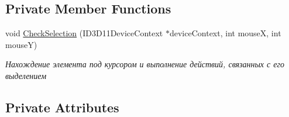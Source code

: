 \subsection*{Private Member Functions}
\begin{DoxyCompactItemize}
\item 
void \hyperlink{class_interface_class_a3e7e6b441d10db7836e42e0746338287}{Check\+Selection} (I\+D3\+D11\+Device\+Context $\ast$device\+Context, int mouseX, int mouseY)
\begin{DoxyCompactList}\small\item\em Нахождение элемента под курсором и выполнение действий, связанных с его выделением \end{DoxyCompactList}\end{DoxyCompactItemize}
\subsection*{Private Attributes}
